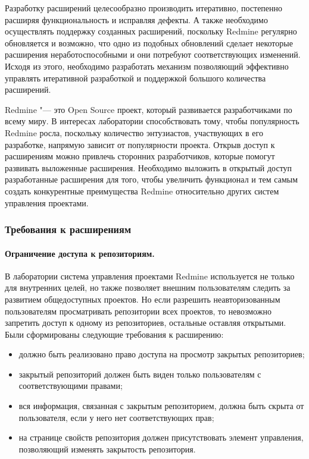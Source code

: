 Разработку расширений целесообразно производить итеративно, постепенно расширяя
функциональность и исправляя дефекты. А также необходимо осуществлять поддержку
созданных расширений, поскольку Redmine регулярно обновляется и возможно, что
одно из подобных обновлений сделает некоторые расширения неработоспособными и
они потребуют соответствующих изменений. Исходя из этого, необходимо
разработать механизм позволяющий эффективно управлять итеративной разработкой и
поддержкой большого количества расширений.

Redmine "--- это Open Source проект, который развивается разработчиками по
всему миру. В интересах лаборатории способствовать тому, чтобы популярность
Redmine росла, поскольку количество энтузиастов, участвующих в его разработке,
напрямую зависит от популярности проекта. Открыв доступ к расширениям можно
привлечь сторонних разработчиков, которые помогут развивать выложенные
расширения. Необходимо выложить в открытый доступ разработанные расширения для
того, чтобы увеличить функционал и тем самым создать конкурентные преимущества
Redmine относительно других систем управления проектами.

\subsubsection{Требования к расширениям}

\paragraph{Ограничение доступа к репозиториям.}
\label{definiton:private_repository}
В лаборатории система управления проектами Redmine используется не только для
внутренних целей, но также позволяет внешним пользователям следить за развитием
общедоступных проектов. Но если разрешить неавторизованным пользователям
просматривать репозитории всех проектов, то невозможно запретить доступ к
одному из репозиториев, остальные оставляя открытыми. Были сформированы
следующие требования к расширению:
\begin{itemize}
  \item должно быть реализовано право доступа на просмотр закрытых
  репозиториев;
  \item закрытый репозиторий должен быть виден только пользователям с
  соответствующими правами;  
  \item вся информация, связанная с закрытым репозиторием, должна быть скрыта
  от пользователя, если у него нет соответствующих прав;
  \item на странице свойств репозитория должен присутствовать элемент
  управления, позволяющий изменять закрытость репозитория.
\end{itemize}


